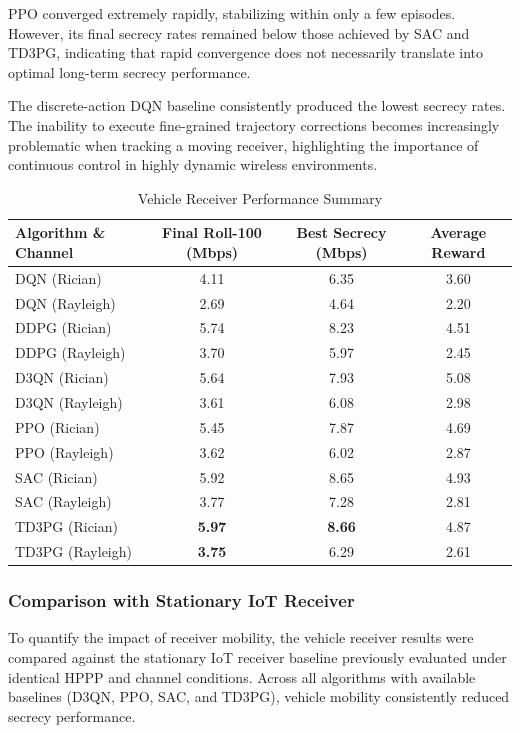 \documentclass[journal,onecolumn]{IEEEtran}
\begin{document}
PPO converged extremely rapidly, stabilizing within only a few episodes. However, its final secrecy rates remained below those achieved by SAC and TD3PG, indicating that rapid convergence does not necessarily translate into optimal long-term secrecy performance.

The discrete-action DQN baseline consistently produced the lowest secrecy rates. The inability to execute fine-grained trajectory corrections becomes increasingly problematic when tracking a moving receiver, highlighting the importance of continuous control in highly dynamic wireless environments.

\begin{table}[h!]
\caption{Vehicle Receiver Performance Summary}
\label{tab:vehicle_receiver_comparison}
\centering
\begin{tabular}{lccc}
\toprule
\textbf{Algorithm \& Channel} &
\textbf{Final Roll-100 (Mbps)} &
\textbf{Best Secrecy (Mbps)} &
\textbf{Average Reward} \\
\midrule
DQN (Rician)      & 4.11 & 6.35 & 3.60 \\
DQN (Rayleigh)    & 2.69 & 4.64 & 2.20 \\
DDPG (Rician)     & 5.74 & 8.23 & 4.51 \\
DDPG (Rayleigh)   & 3.70 & 5.97 & 2.45 \\
D3QN (Rician)     & 5.64 & 7.93 & 5.08 \\
D3QN (Rayleigh)   & 3.61 & 6.08 & 2.98 \\
PPO (Rician)      & 5.45 & 7.87 & 4.69 \\
PPO (Rayleigh)    & 3.62 & 6.02 & 2.87 \\
SAC (Rician)      & 5.92 & 8.65 & 4.93 \\
SAC (Rayleigh)    & 3.77 & 7.28 & 2.81 \\
TD3PG (Rician)    & \textbf{5.97} & \textbf{8.66} & 4.87 \\
TD3PG (Rayleigh)  & \textbf{3.75} & 6.29 & 2.61 \\
\bottomrule
\end{tabular}
\end{table}

\subsubsection{Comparison with Stationary IoT Receiver}

To quantify the impact of receiver mobility, the vehicle receiver results were compared against the stationary IoT receiver baseline previously evaluated under identical HPPP and channel conditions. Across all algorithms with available baselines (D3QN, PPO, SAC, and TD3PG), vehicle mobility consistently reduced secrecy performance.
\end{document}
